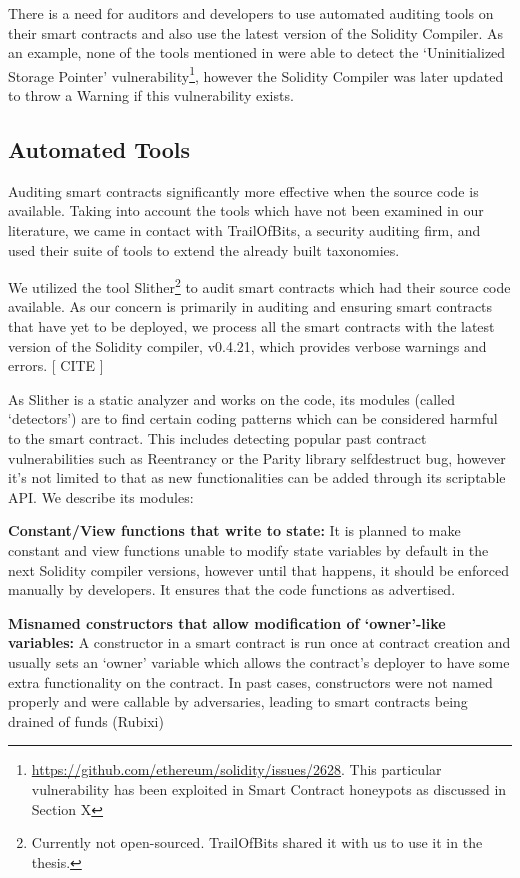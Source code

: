 There is a need for auditors and developers to use automated auditing tools on their smart contracts and also use the latest version of the Solidity  Compiler. As an example, none of the tools mentioned in \cite{tools} were able to detect the `Uninitialized Storage Pointer' vulnerability\footnote{\url{https://github.com/ethereum/solidity/issues/2628}. This particular vulnerability has been exploited in Smart Contract honeypots as discussed in Section X}, however the Solidity Compiler was later updated to throw a Warning if this vulnerability exists. 

\subsection{Automated Tools}

Auditing smart contracts significantly more effective when the source code is available. Taking into account the tools which have not been examined in our literature, we came in contact with TrailOfBits, a security auditing firm, and used their suite of tools to extend the already built taxonomies.

We utilized the tool Slither\footnote{Currently not open-sourced. TrailOfBits shared it with us to use it in the thesis.} to audit smart contracts which had their source code available. As our concern is primarily in auditing and ensuring smart contracts that have yet to be deployed, we process all the smart contracts with the latest version of the Solidity compiler, v0.4.21, which provides verbose warnings and errors. [ CITE ]

As Slither is a static analyzer and works on the code, its modules (called `detectors') are to find certain coding patterns which can be considered harmful to the smart contract. This includes detecting popular past contract vulnerabilities such as Reentrancy or the Parity library selfdestruct bug, however it's not limited to that as new functionalities can be added through its scriptable API. We describe its modules:

\textbf{Constant/View functions that write to state:} It is planned to make constant and view functions unable to modify state variables by default in the next Solidity compiler versions, however until that happens, it should be enforced manually by developers. It ensures that the code functions as advertised.

\textbf{Misnamed constructors that allow modification of `owner'-like variables:} A constructor in a smart contract is run once at contract creation and usually sets an `owner' variable which allows the contract's deployer to have some extra functionality on the contract. In past cases, constructors were not named properly and were callable by adversaries, leading to smart contracts being drained of funds (Rubixi)

